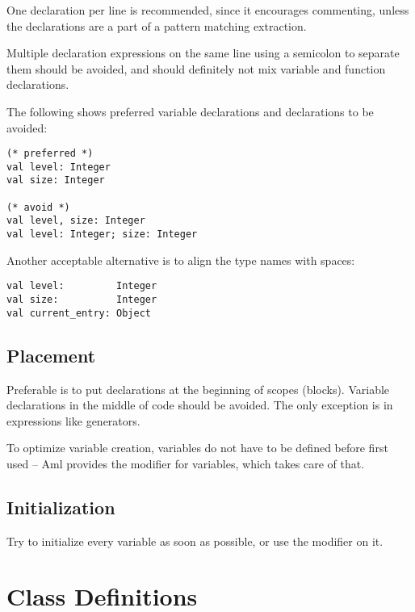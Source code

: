 One declaration per line is recommended, since it encourages commenting, unless the declarations are a part of a pattern matching extraction. 

Multiple declaration expressions on the same line using a semicolon to separate them should be avoided, and should definitely not mix variable and function declarations. 

\example The following shows preferred variable declarations and declarations to be avoided:
\begin{lstlisting}
(* preferred *)
val level: Integer
val size: Integer

(* avoid *)
val level, size: Integer
val level: Integer; size: Integer
\end{lstlisting}

\example Another acceptable alternative is to align the type names with spaces: 
\begin{lstlisting}
val level:         Integer
val size:          Integer
val current_entry: Object
\end{lstlisting}





\subsection{Placement}

Preferable is to put declarations at the beginning of scopes (blocks). Variable declarations in the middle of code should be avoided. The only exception is in expressions like generators. 

To optimize variable creation, variables do not have to be defined before first used -- Aml provides the  modifier for variables, which takes care of that. 





\subsection{Initialization}

Try to initialize every variable as soon as possible, or use the  modifier on it. 






\section{Class Definitions}

